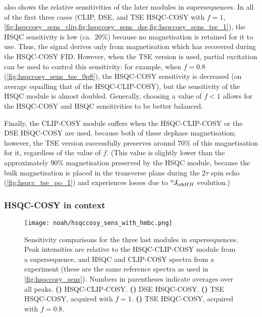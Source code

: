  also shows the relative sensitivities of the later modules in  supersequences.
In all of the first three cases (CLIP, DSE, and TSE HSQC-COSY with $f = 1$, \cref{fig:hsqccosy_sens_clip,fig:hsqccosy_sens_dse,fig:hsqccosy_sens_tse_1}), the HSQC sensitivity is low (ca.\ 20\%) because no  magnetisation is retained for it to use.
Thus, the signal derives only from  magnetisation which has recovered during the HSQC-COSY FID.
However, when the TSE version is used, partial  excitation can be used to control this sensitivity: for example, when $f = 0.8$ (\cref{fig:hsqccosy_sens_tse_0p8}), the HSQC-COSY sensitivity is decreased (on average equalling that of the HSQC-CLIP-COSY), but the sensitivity of the HSQC module is almost doubled.
Generally, choosing a value of $f < 1$ allows for the HSQC-COSY and HSQC sensitivities to be better balanced.

Finally, the CLIP-COSY module suffers when the HSQC-CLIP-COSY or the DSE HSQC-COSY are used, because both of these dephase  magnetisation;
however, the TSE version successfully preserves around $70\%$ of this magnetisation for it, regardless of the value of $f$.
(This value is slightly lower than the approximately $90\%$ magnetisation preserved by the HSQC module, because the bulk magnetisation is placed in the transverse plane during the $2\tau$ spin echo (\cref{fig:hsqcc_tse_po_1}) and experiences losses due to $\nJ{HH}$ evolution.)


\subsubsection{HSQC-COSY in context}

\begin{figure}[!ht]
    \centering
    \texttt{[image: noah/hsqccosy\_sens\_with\_hmbc.png]}%
    {\label{fig:hsqccosy_sens_with_hmbc_clip}}%
    {\label{fig:hsqccosy_sens_with_hmbc_dse}}%
    {\label{fig:hsqccosy_sens_with_hmbc_tse_1}}%
    {\label{fig:hsqccosy_sens_with_hmbc_tse_0p8}}%
    \caption[Sensitivity comparisons for  supersequences]{
        Sensitivity comparisons for the three last modules in  supersequences.
        Peak intensities are relative to the HSQC-CLIP-COSY module from a  supersequence, and HSQC and CLIP-COSY spectra from a  experiment (these are the same reference spectra as used in \cref{fig:hsqccosy_sens}).
        Numbers in parentheses indicate averages over all peaks.
        \textbf{()} HSQC-CLIP-COSY.
        \textbf{()} DSE HSQC-COSY.
        \textbf{()} TSE HSQC-COSY, acquired with $f = 1$.
        \textbf{()} TSE HSQC-COSY, acquired with $f = 0.8$.
    }
    \label{fig:hsqccosy_sens_with_hmbc}
\end{figure}

